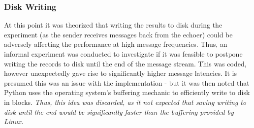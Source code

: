 \documentclass[../dissertation.tex]{subfiles}
\begin{document}
\subsubsection{Disk Writing}

At this point it was theorized that writing the results to disk during the experiment (as the sender receives messages back from the echoer) could be adversely affecting the performance at high message frequencies. Thus, an informal experiment was conducted to investigate if it was feasible to postpone writing the records to disk until the end of the message stream. This was coded\cite{Experiment1NoDiskWriteCode}, however unexpectedly gave rise to significantly higher message latencies. It is presumed this was an issue with the implementation - but it was then noted that Python uses the operating system's buffering mechanic to efficiently write to disk in blocks. \textit{Thus, this idea was discarded, as it not expected that saving writing to disk until the end would be significantly faster than the buffering provided by Linux.}
\end{document}
